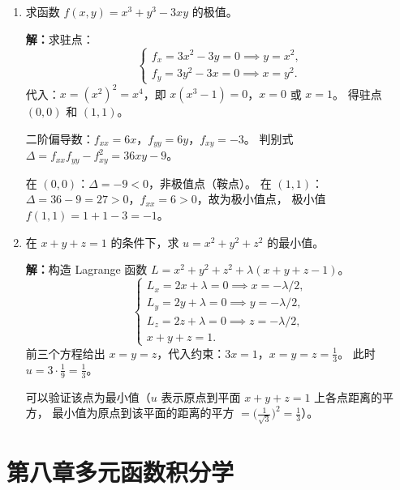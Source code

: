 \documentclass[12pt,a4paper]{ctexart}
\begin{document}
\begin{enumerate}[leftmargin=*,label=\arabic*.,start=35]
    切平面：$2(x-1) + 2(y-1) - (z-2) = 0$，即 $2x+2y-z-2=0$。

    法线：$\frac{x-1}{2} = \frac{y-1}{2} = \frac{z-2}{-1}$。

  \item 求函数 $f(x,y) = x^3 + y^3 - 3xy$ 的极值。

    \textbf{解：}求驻点：
    \[
    \begin{cases}
      f_x = 3x^2 - 3y = 0 \implies y = x^2, \\
      f_y = 3y^2 - 3x = 0 \implies x = y^2.
    \end{cases}
    \]
    代入：$x = (x^2)^2 = x^4$，即 $x(x^3-1)=0$，$x=0$ 或 $x=1$。
    得驻点 $(0,0)$ 和 $(1,1)$。

    二阶偏导数：$f_{xx} = 6x$，$f_{yy} = 6y$，$f_{xy} = -3$。
    判别式 $\Delta = f_{xx}f_{yy} - f_{xy}^2 = 36xy - 9$。

    在 $(0,0)$：$\Delta = -9 < 0$，非极值点（鞍点）。
    在 $(1,1)$：$\Delta = 36-9 = 27 > 0$，$f_{xx}=6>0$，故为极小值点，
    极小值 $f(1,1) = 1+1-3 = -1$。

  \item 在 $x + y + z = 1$ 的条件下，求 $u = x^2 + y^2 + z^2$ 的最小值。

    \textbf{解：}构造 Lagrange 函数 $L = x^2+y^2+z^2 + \lambda(x+y+z-1)$。
    \[
    \begin{cases}
      L_x = 2x + \lambda = 0 \implies x = -\lambda/2, \\
      L_y = 2y + \lambda = 0 \implies y = -\lambda/2, \\
      L_z = 2z + \lambda = 0 \implies z = -\lambda/2, \\
      x+y+z = 1.
    \end{cases}
    \]
    前三个方程给出 $x=y=z$，代入约束：$3x=1$，$x=y=z=\frac{1}{3}$。
    此时 $u = 3 \cdot \frac{1}{9} = \frac{1}{3}$。

    可以验证该点为最小值（$u$ 表示原点到平面 $x+y+z=1$ 上各点距离的平方，
    最小值为原点到该平面的距离的平方 $= \bigl(\frac{1}{\sqrt{3}}\bigr)^2 = \frac{1}{3}$）。
\end{enumerate}

\section*{第八章\quad 多元函数积分学}
\end{document}
